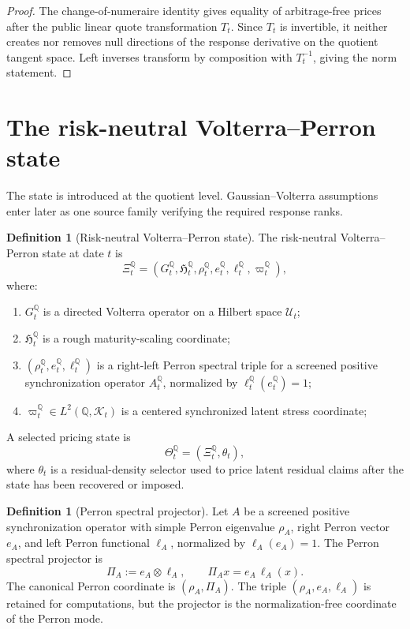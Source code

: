 \documentclass[11pt,a4paper]{amsart}
\theoremstyle{plain}
\theoremstyle{definition}
\newtheorem{definition}[theorem]{Definition}
\theoremstyle{remark}
\newcommand{\QQ}{\mathbb{Q}}
\newcommand{\cK}{\mathcal{K}}
\newcommand{\cU}{\mathcal{U}}
\begin{document}
\begin{proof}
The change-of-numeraire identity gives equality of arbitrage-free prices after the public linear
quote transformation \(T_t\).  Since \(T_t\) is invertible, it neither creates nor removes null
directions of the response derivative on the quotient tangent space.  Left inverses transform by
composition with \(T_t^{-1}\), giving the norm statement.
\end{proof}

\section{The risk-neutral Volterra--Perron state}\label{sec:state}

The state is introduced at the quotient level.  Gaussian--Volterra assumptions enter later as one
source family verifying the required response ranks.

\begin{definition}[Risk-neutral Volterra--Perron state]\label{def:q-state}
The risk-neutral Volterra--Perron state at date \(t\) is
\[
        \Xi_t^\QQ
        =
        (G_t^\QQ,\mathfrak{H}_t^\QQ,\rho_t^\QQ,e_t^\QQ,\ell_t^\QQ,\varpi_t^\QQ),
\]
where:
\begin{enumerate}[leftmargin=2em]
\item \(G_t^\QQ\) is a directed Volterra operator on a Hilbert space \(\cU_t\);
\item \(\mathfrak{H}_t^\QQ\) is a rough maturity-scaling coordinate;
\item \((\rho_t^\QQ,e_t^\QQ,\ell_t^\QQ)\) is a right-left Perron spectral triple for a screened
positive synchronization operator \(A_t^\QQ\), normalized by
\(\ell_t^\QQ(e_t^\QQ)=1\);
\item \(\varpi_t^\QQ\in L^2(\QQ,\cK_t)\) is a centered synchronized latent stress coordinate;
\end{enumerate}
A selected pricing state is
\[
        \Theta_t^\QQ=(\Xi_t^\QQ,\theta_t),
\]
where \(\theta_t\) is a residual-density selector used to price latent residual claims after the
state has been recovered or imposed.
\end{definition}

\begin{definition}[Perron spectral projector]\label{def:perron-projector}
Let \(A\) be a screened positive synchronization operator with simple Perron eigenvalue
\(\rho_A\), right Perron vector \(e_A\), and left Perron functional \(\ell_A\), normalized by
\(\ell_A(e_A)=1\).  The Perron spectral projector is
\[
        \Pi_A:=e_A\otimes\ell_A,
        \qquad
        \Pi_A x=e_A\,\ell_A(x).
\]
The canonical Perron coordinate is \((\rho_A,\Pi_A)\).  The triple
\((\rho_A,e_A,\ell_A)\) is retained for computations, but the projector is the
normalization-free coordinate of the Perron mode.
\end{definition}
\end{document}
